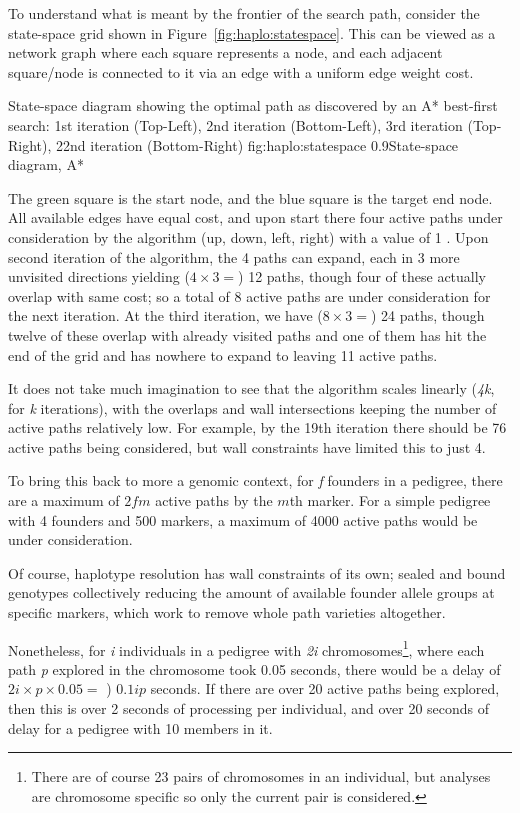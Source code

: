 To understand what is meant by the frontier of the search path, consider the state-space grid shown in Figure~\ref{fig:haplo:statespace}. This can be viewed as a network graph where each square represents a node, and each adjacent square/node is connected to it via an edge with a uniform edge weight cost.

	{State-space diagram showing the optimal path as discovered by an A* best-first search: 1st iteration (Top-Left), 2nd iteration (Bottom-Left), 3rd iteration (Top-Right), 22nd iteration (Bottom-Right)}
	{fig:haplo:statespace}
	{0.9}{State-space diagram, A*}
	
The green square is the start node, and the blue square is the target end node. All available edges have equal cost, and upon start there four active paths under consideration by the algorithm (up, down, left, right) with a value of 1 . Upon second iteration of the algorithm, the 4 paths can expand, each in 3 more unvisited directions yielding ($4 \times 3 = $) 12 paths, though four of these actually overlap with same cost; so a total of 8 active paths are under consideration for the next iteration. At the third iteration, we have ($8 \times 3 = $) 24 paths, though twelve of these overlap with already visited paths and one of them  has hit the end of the grid and has nowhere to expand to leaving 11 active paths.

It does not take much imagination to see that the algorithm scales linearly (\textit{4k}, for \textit{k} iterations), with the overlaps and wall intersections keeping the number of active paths relatively low. For example, by the 19th iteration there should be 76 active paths being considered, but wall constraints  have limited this to just 4.

To bring this back to more a genomic context, for \textit{f} founders in a pedigree, there are a maximum of $2fm$ active paths by the $m$th marker. For a simple pedigree with 4 founders and 500 markers, a maximum of 4000 active paths would be under consideration.

Of course, haplotype resolution has wall constraints of its own; sealed and bound genotypes  collectively reducing the amount of available founder allele groups at specific markers, which work to remove whole path varieties altogether.

Nonetheless, for \textit{i} individuals in a pedigree with \textit{2i} chromosomes\footnote{There are of course 23 pairs of chromosomes in an individual, but analyses are chromosome specific so only the current pair is considered.}, where each path \textit{p} explored in the chromosome took 0.05 seconds, there would be a delay of $2i \times p \times 0.05  =$ ) $0.1 ip$ seconds. If there are over 20 active paths being explored, then this is over 2 seconds of processing per individual, and over 20 seconds of delay for a pedigree with 10 members in it.

